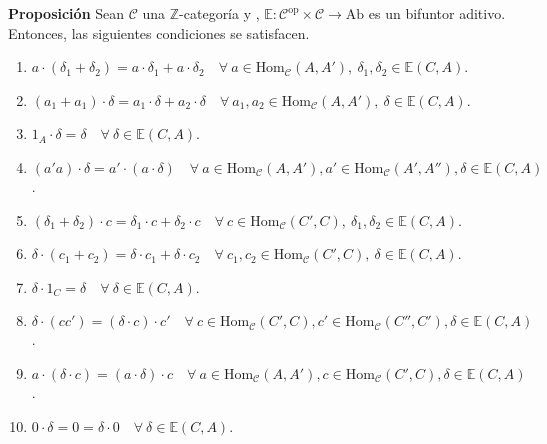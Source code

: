 \documentclass[preview]{standalone}
\begin{document}
\begin{center}
\flushleft \textbf{Proposición} Sean $\mathscr{C}$ una $\mathbb{Z}$-categoría y , $\mathbb{E}:\mathscr{C}^\text{op}\times\mathscr{C}\to\text{Ab}$ es un bifuntor aditivo. Entonces, las siguientes condiciones se satisfacen. \begin{enumerate}[label=(\alph*)] \item $a\cdot(\delta_1+\delta_2) = a\cdot\delta_1 + a\cdot\delta_2 \quad \forall \ a\in\text{Hom}_\mathscr{C}(A,A'), \ \delta_1,\delta_2\in\mathbb{E}(C,A)$. \item $(a_1+a_1)\cdot\delta = a_1\cdot\delta + a_2\cdot\delta \quad \forall \ a_1,a_2\in\text{Hom}_\mathscr{C}(A,A'), \ \delta\in\mathbb{E}(C,A)$. \item $1_A\cdot\delta = \delta \quad \forall \ \delta\in\mathbb{E}(C,A)$. \item $(a'a)\cdot\delta = a'\cdot(a\cdot\delta) \quad \forall \ a\in\text{Hom}_\mathscr{C}(A,A'), a'\in\text{Hom}_\mathscr{C}(A',A''), \delta\in\mathbb{E}(C,A)$. \item $(\delta_1+\delta_2)\cdot c = \delta_1\cdot c + \delta_2\cdot c \quad \forall \ c\in\text{Hom}_\mathscr{C}(C',C), \ \delta_1,\delta_2\in\mathbb{E}(C,A)$. \item $\delta\cdot(c_1+c_2)=\delta\cdot c_1 + \delta\cdot c_2 \quad \forall \ c_1,c_2\in\text{Hom}_\mathscr{C}(C',C), \ \delta\in\mathbb{E}(C,A)$. \item $\delta\cdot1_C  = \delta\quad \forall \ \delta\in\mathbb{E}(C,A)$. \item $\delta\cdot(cc') = (\delta\cdot c)\cdot c' \quad \forall \ c\in\text{Hom}_\mathscr{C}(C',C), c'\in\text{Hom}_\mathscr{C}(C'',C'), \delta\in\mathbb{E}(C,A)$. \item $a\cdot(\delta\cdot c) = (a\cdot\delta)\cdot c \quad \forall \ a\in\text{Hom}_\mathscr{C}(A,A'), c\in\text{Hom}_\mathscr{C}(C',C), \delta\in\mathbb{E}(C,A)$. \item $0\cdot\delta = 0 = \delta\cdot0 \quad \forall \ \delta\in\mathbb{E}(C,A)$. \end{enumerate}
\end{center}
\end{document}
